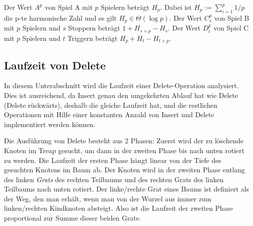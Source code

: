 \documentclass[a4paper]{scrreprt}
\theoremstyle{definition}
\begin{document}
Der Wert $A^p$ von Spiel A mit $p$ Spielern beträgt $H_p$.
Dabei ist $H_p := \sum_{i=1}^p 1/p$ die p-te harmonische Zahl und es gilt $H_p \in \Theta(\log p)$.
Der Wert $C_s^p$ von Spiel B mit $p$ Spielern und $s$ Stoppern beträgt $1 + H_{s+p} - H_s$.
Der  Wert $D_t^p$ von Spiel C mit $p$ Spielern und $t$ Triggern beträgt $H_p + H_t - H_{t+p}$.~\cite{RandAlg}

\subsection{Laufzeit von Delete}
\label{sec:delruntime}
In diesem Unterabschnitt wird die Laufzeit einer Delete-Operation analysiert.
Dies ist ausreichend, da Insert genau den umgekehrten Ablauf hat wie Delete (\glqq Delete rückwärts\grqq), deshalb die gleiche Laufzeit hat, und die restlichen Operationen mit Hilfe einer konstanten Anzahl von Insert und Delete implementiert werden können.

Die Ausführung von Delete besteht aus 2 Phasen:
Zuerst wird der zu löschende Knoten im Treap gesucht, um dann in der zweiten Phase bis nach unten rotiert zu werden.
Die Laufzeit der ersten Phase hängt linear von der Tiefe des gesuchten Knotens im Baum ab.
Der Knoten wird in der zweiten Phase entlang des linken \emph{Grats} des rechten Teilbaums und des rechten Grats des linken Teilbaums nach unten rotiert.
Der linke/rechte Grat eines Baums ist definiert als der Weg, den man erhält, wenn man von der Wurzel aus immer zum linken/rechten Kindknoten absteigt.
Also ist die Laufzeit der zweiten Phase proportional zur Summe dieser beiden Grate.
\end{document}
